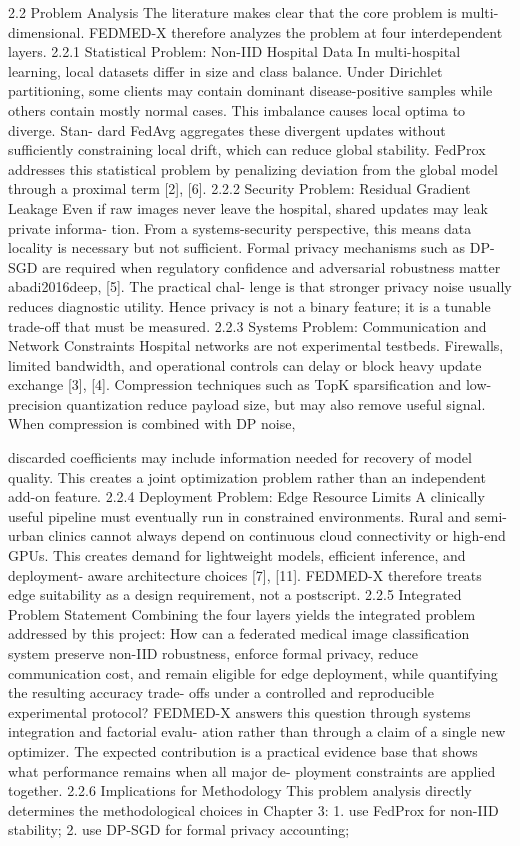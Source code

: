 2.2
Problem Analysis
The literature makes clear that the core problem is multi-dimensional. FEDMED-X therefore analyzes the problem at four interdependent layers.
2.2.1
Statistical Problem: Non-IID Hospital Data
In multi-hospital learning, local datasets differ in size and class balance. Under Dirichlet partitioning, some clients may contain dominant disease-positive samples while others contain mostly normal cases. This imbalance causes local optima to diverge. Stan- dard FedAvg aggregates these divergent updates without sufficiently constraining local drift, which can reduce global stability. FedProx addresses this statistical problem by penalizing deviation from the global model through a proximal term [2], [6].
2.2.2
Security Problem: Residual Gradient Leakage
Even if raw images never leave the hospital, shared updates may leak private informa- tion. From a systems-security perspective, this means data locality is necessary but not sufficient. Formal privacy mechanisms such as DP-SGD are required when regulatory confidence and adversarial robustness matter abadi2016deep, [5]. The practical chal- lenge is that stronger privacy noise usually reduces diagnostic utility. Hence privacy is not a binary feature; it is a tunable trade-off that must be measured.
2.2.3
Systems Problem: Communication and Network Constraints
Hospital networks are not experimental testbeds. Firewalls, limited bandwidth, and operational controls can delay or block heavy update exchange [3], [4]. Compression techniques such as TopK sparsification and low-precision quantization reduce payload size, but may also remove useful signal. When compression is combined with DP noise,

discarded coefficients may include information needed for recovery of model quality.
This creates a joint optimization problem rather than an independent add-on feature.
2.2.4
Deployment Problem: Edge Resource Limits
A clinically useful pipeline must eventually run in constrained environments. Rural and semi-urban clinics cannot always depend on continuous cloud connectivity or high-end
GPUs. This creates demand for lightweight models, efficient inference, and deployment- aware architecture choices [7], [11]. FEDMED-X therefore treats edge suitability as a design requirement, not a postscript.
2.2.5
Integrated Problem Statement
Combining the four layers yields the integrated problem addressed by this project:
How can a federated medical image classification system preserve non-IID robustness, enforce formal privacy, reduce communication cost, and remain eligible for edge deployment, while quantifying the resulting accuracy trade- offs under a controlled and reproducible experimental protocol?
FEDMED-X answers this question through systems integration and factorial evalu- ation rather than through a claim of a single new optimizer. The expected contribution is a practical evidence base that shows what performance remains when all major de- ployment constraints are applied together.
2.2.6
Implications for Methodology
This problem analysis directly determines the methodological choices in Chapter 3:
1. use FedProx for non-IID stability; 2. use DP-SGD for formal privacy accounting;

